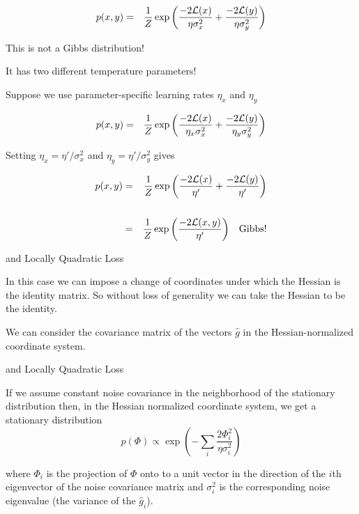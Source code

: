 {

\begin{eqnarray*}
p(x,y) & = & \frac{1}{Z} \exp\left(\frac{-2{\cal L}(x)}{ \eta \sigma_x^2} + \frac{-2{\cal L}(y)}{\eta \sigma_y^2}\right)
\end{eqnarray*}

\vfill
This is not a Gibbs distribution!

\vfill
It has two different temperature parameters!


Suppose we use parameter-specific learning rates $\eta_x$ and $\eta_y$

\begin{eqnarray*}
p(x,y) & = & \frac{1}{Z} \exp\left(\frac{-2{\cal L}(x)}{ \eta_x \sigma_x^2} + \frac{-2{\cal L}(y)}{\eta_y \sigma_y^2}\right)
\end{eqnarray*}

Setting $\eta_x = \eta'/\sigma^2_x$ and $\eta_y = \eta'/\sigma^2_y$ gives

\begin{eqnarray*}
p(x,y) & = & \frac{1}{Z} \exp\left(\frac{-2{\cal L}(x)}{ \eta'} + \frac{-2{\cal L}(y)}{\eta'}\right) \\
\\
& = & \frac{1}{Z} \exp\left(\frac{-2{\cal L}(x,y)}{\eta'}\right)\;\;\;\mathrm{Gibbs!}
\end{eqnarray*}

{and Locally Quadratic Loss}

In this case we can impose a change of coordinates under which the Hessian is the identity matrix.  So without loss of generality we can take the
Hessian to be the identity.

\vfill
We can consider the covariance matrix of the vectors $\hat{g}$ in the Hessian-normalized coordinate system.

{and Locally Quadratic Loss}

If we assume constant noise covariance in the neighborhood of the stationary distribution then, in the Hessian normalized
coordinate system, we get a stationary distribution
$$p(\Phi) \propto \exp\left(-\sum_i \frac{2{\Phi_i^2}}{\eta\sigma_i^2}\right)$$

\vfill
where $\Phi_i$ is the projection of $\Phi$ onto to a unit vector in the direction of the $i$th eigenvector of the noise covariance matrix and $\sigma^2_i$
is the corresponding noise eigenvalue (the variance of the $\hat{g}_i$).

}
